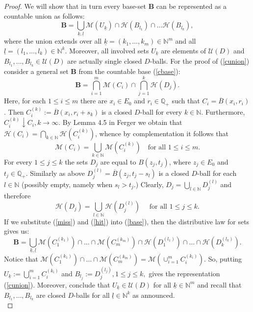 \documentclass[sn-mathphys,Numbered]{sn-jnl}%
\theoremstyle{thmstyleone}%
\theoremstyle{thmstyletwo}%
\theoremstyle{thmstylethree}%
\begin{document}
\begin{proof}
We will show that in turn every base-set $\textbf{B}$ can be represented as a countable union as follows:
\begin{equation} \label{cunion}
 \textbf{B}= \bigcup_{\underline{k},\underline{l}} \mathcal{M}(U_{\underline{k}}) \cap \mathcal{H}(B_{l_1}) \cap \ldots \mathcal{H}(B_{l_k}),
\end{equation}
where the union extends over all $\underline{k}=(k_1,\ldots,k_m) \in \mathbb{N}^m$ and all $\underline{l}=(l_1,\ldots,l_k) \in \mathbb{N}^k.$
Moreover, all involved sets $U_{\underline{k}}$ are elements of $\mathcal{U}(D)$ and $B_{l_1},\ldots,B_{l_k} \in \mathcal{U}(D)$ are actually single closed $D$-balls.
For the proof of (\ref{cunion}) consider a general set $\textbf{B}$ from the countable base (\ref{cbase}):
\begin{equation} \label{base}
\textbf{B}=\bigcap_{i=1}^m \mathcal{M}(C_i) \cap \bigcap_{j=1}^k \mathcal{H}(D_j).
\end{equation}
Here, for each $1 \le i \le m$ there are $x_i \in E_0$ and $r_i \in \mathbb{Q}_+$ such that $C_i=\overline{B}(x_i,r_i)$.
Then $C_i^{(k)}:=\overline{B}(x_i,r_i+s_k)$ is a closed $D$-ball for every $ k \in \mathbb{N}$. Furthermore,  $C_i^{(k)} \downarrow C_i, k \rightarrow \infty$.
By Lemma 4.5 in Ferger \cite{Ferger2} we obtain that $\mathcal{H}(C_i)= \bigcap_{k \in \mathbb{N}} \mathcal{H}(C_i^{(k)})$, whence by complementation
it follows that
\begin{equation} \label{miss}
 \mathcal{M}(C_i)= \bigcup_{k \in \mathbb{N}} \mathcal{M}(C_i^{(k)}) \quad \text{for all } 1 \le i \le m.
\end{equation}
For every $1 \le j \le k$ the sets $D_j$ are equal to $B(z_j,t_j)$, where $z_j \in E_0$ and $t_j \in \mathbb{Q}_+$.
Similarly as above $D_j^{(l)}=\overline{B}(z_j,t_j-s_l)$ is a closed $D$-ball for each $ l \in \mathbb{N}$ (possibly empty, namely when $s_l>t_j$.) Clearly, $D_j=\bigcup_{l \in \mathbb{N}} D_j^{(l)}$ and therefore
\begin{equation} \label{hit}
 \mathcal{H}(D_j)= \bigcup_{l \in \mathbb{N}} \mathcal{H}(D_j^{(l)}) \quad \text{ for all } 1 \le j \le k.
\end{equation}
If we substitute (\ref{miss}) and (\ref{hit}) into (\ref{base}), then the distributive law for sets gives us:
\begin{equation} \label{firstunion}
 \textbf{B} = \bigcup_{\underline{k},\underline{l}} \mathcal{M}(C_1^{(k_1)}) \cap \ldots \cap \mathcal{M}(C_m^{(k_m)}) \cap \mathcal{H}(D_1^{(l_1)}) \cap \ldots \cap \mathcal{H}(D_k^{(l_k)}).
\end{equation}
Notice that $\mathcal{M}(C_1^{(k_1)}) \cap \ldots \cap \mathcal{M}(C_m^{(k_m)})=\mathcal{M}(\cup_{i=1}^m C_i^{(k_i)})$.
So, putting $U_{\underline{k}}:=\bigcup_{i=1}^m C_i^{(k_i)}$ and $B_{l_j}:=D_j^{(l_j)}, 1 \le j \le k,$ gives the representation (\ref{cunion}). Moreover, conclude that $U_{\underline{k}} \in \mathcal{U}(D)$
for all $\underline{k} \in \mathbb{N}^m$ and recall that $B_{l_1},\ldots,B_{l_k}$ are closed $D$-balls for all $\underline{l} \in \mathbb{N}^k$ as announced.\\


\end{proof}
\end{document}
